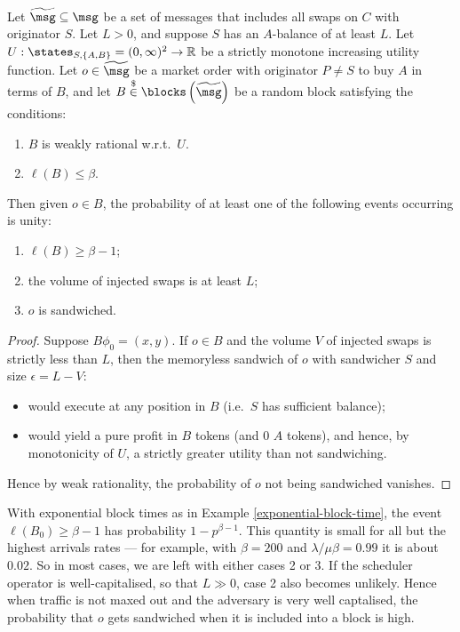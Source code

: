 \documentclass[a4paper,11pt]{article}
\begin{document}
\begin{theorem}
\label{sandwich-existence}

  Let $\widetilde\msg\subseteq\msg$ be a set of messages that includes all swaps on $C$ with originator $S$. 
  Let $L>0$, and suppose $S$ has an $A$-balance of at least $L$.
  Let $U:\states_{S,\{A,B\}}=(0,\infty)^2\rightarrow\R$ be a strictly monotone increasing utility function.
  Let $o\in \widetilde\msg$ be a market order with originator $P\neq S$ to buy $A$ in terms of $B$, and let $B\stackrel{\$}{\in}\blocks\left(\widetilde\msg\right)$ be a random block satisfying the conditions:
  \begin{enumerate}
    \item $B$ is weakly rational w.r.t.~$U$.
    \item $\ell(B)\leq \beta$.
  \end{enumerate}
  Then given $o\in B$, the probability of at least one of the following events occurring is unity:
  \begin{enumerate}
    \item $\ell(B)\geq \beta-1$;
    \item the volume of injected swaps is at least $L$;
    \item $o$ is sandwiched.
  \end{enumerate}
  
\end{theorem}
%
\begin{proof}

  Suppose $B\phi_0=(x,y)$.
  If $o\in B$ and the volume $V$ of injected swaps is strictly less than $L$, then the memoryless sandwich of $o$ with sandwicher $S$ and size $\epsilon = L-V$:
  \begin{itemize}
    \item would execute at any position in $B$ (i.e.~$S$ has sufficient balance);
    \item would yield a pure profit in $B$ tokens (and $0$ $A$ tokens), and hence, by monotonicity of $U$, a strictly greater utility than not sandwiching.
  \end{itemize}
  Hence by weak rationality, the probability of $o$ not being sandwiched vanishes.
  \qedhere
  
\end{proof}

With exponential block times as in Example \ref{exponential-block-time}, the event $\ell(B_0)\geq\beta-1$ has probability $1-p^{\beta-1}$.
%
This quantity is small for all but the highest arrivals rates --- for example, with $\beta=200$ and $\lambda/\mu\beta=0.99$ it is about $0.02$.
%
So in most cases, we are left with either cases 2 or 3.
%
If the scheduler operator is well-capitalised, so that $L\gg0$, case 2 also becomes unlikely.
%
Hence when traffic is not maxed out and the adversary is very well captalised, the probability that $o$ gets sandwiched when it is included into a block is high.
\end{document}
